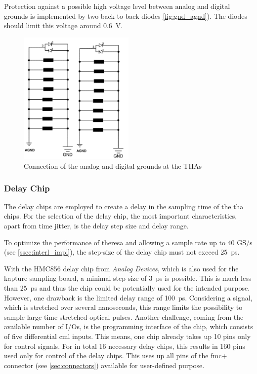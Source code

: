 Protection against a possible high voltage level between analog and digital grounds is implemented by two back-to-back diodes \autoref{fig:gnd_agnd}).
The diodes should limit this voltage around \SI{0.6}{\volt}.

\begin{figure}[tb]
	\centering
	\includegraphics[width = 0.5\textwidth]{chap/04-theresa/img/schematic/gnd_agnd}
	\caption{Connection of the analog and digital grounds at the THAs}
	\label{fig:gnd_agnd}
\end{figure}

\subsubsection*{Delay Chip}
The delay chips are employed to create a delay in the sampling time of the \gls{tha} chips. For the selection of the delay chip, the most important characteristics, apart from time jitter, is the delay step size and delay range. 

To optimize the performance of \gls{theresa} and allowing a sample rate up to 40 GS/s (see \autoref{ssec:interl_impl}), the step-size of the delay chip must not exceed \SI{25}{\pico \second}.

With the HMC856 delay chip from \textit{Analog Devices}, which is also used for the \gls{kapture} sampling board, a minimal step size of \SI{3}{\pico\second} \cite{hmc856} is possible.
This is much less than  \SI{25}{\pico \second} and thus the chip could be potentially used for the intended purpose.
However, one drawback is the limited delay range of \SI{100}{\pico\second}.
Considering a signal, which is stretched over several nanoseconds, this range limits the possibility to sample large time-stretched optical pulses.
Another challenge, coming from the available number of I/Os, is the programming interface of the chip, which consists of five differential \gls{cml} inputs.
This means, one chip already takes up 10 pins only for control signals.
For in total 16 necessary delay chips, this results in 160 pins used only for control of the delay chips.
This uses up all pins of the \gls{fmc}+ connector (see \autoref{sec:connectors}) available for user-defined purpose. 

